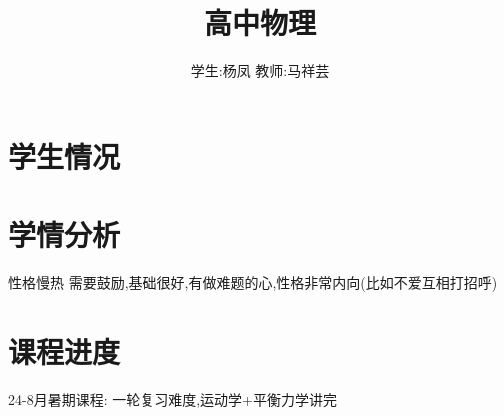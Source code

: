 \documentclass{article}
\title{高中物理}
\author{学生:\quad 杨凤 \quad 教师:\quad 马祥芸}
\begin{document}
\maketitle
\tableofcontents
\newpage
{}

\section{学生情况}
\begin{center}
\end{center}

\section{学情分析}
性格慢热 需要鼓励,基础很好,有做难题的心,性格非常内向(比如不爱互相打招呼)

\section{课程进度}
24-8月暑期课程: 一轮复习难度,运动学+平衡力学讲完
\end{document}
